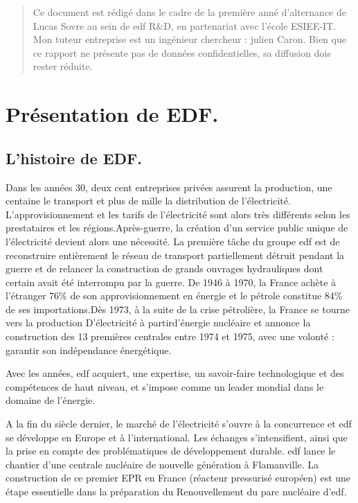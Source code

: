 \begin{abstract}
    Ce document est rédigé dans le cadre de la première anné d'alternance de Lucas Sovre au sein de \acrshort{edf} R\&D, en partenariat avec l'école ESIEE-IT.
    Mon tuteur entreprise est un ingénieur chercheur : julien Caron. Bien que ce rapport ne présente pas de données confidentielles, sa diffusion dois rester réduite.
\end{abstract}
\chapter{Présentation de EDF.}
\section{L'histoire de EDF.}
Dans  les  années  30,  deux  cent  entreprises privées  assurent  la  production,  une  centaine le  transport  et  plus  de  mille  la  distribution  de l’électricité. L’approvisionnement et les tarifs de l’électricité  sont  alors  très  différents  selon les prestataires et les régions.Après-guerre, la création d’un service public unique  de  l’électricité  devient  alors  une nécessité.  La  première  tâche  du  groupe  \acrshort{edf} est  de  reconstruire  entièrement  le  réseau  de transport   partiellement   détruit   pendant   la guerre   et   de   relancer   la   construction   de grands   ouvrages   hydrauliques   dont   certain avait été  interrompu  par  la  guerre. De  1946  à 1970, la France achète à l’étranger 76\% de son approvisionnement  en  énergie  et  le  pétrole constitue 84\% de ses importations.Dès  1973,  à  la  suite  de  la  crise  pétrolière,  la France se tourne vers la production D’électricité à    partird’énergie nucléaire  et  annonce  la  construction  des  13 premières  centrales  entre  1974  et  1975,  avec une   volonté   :   garantir   son   indépendance énergétique.

Avec  les  années,  \acrshort{edf}  acquiert,  une  expertise, un savoir-faire technologique et des compétences  de  haut  niveau,  et  s’impose  comme un leader mondial dans le domaine de l’énergie.

A   la   fin   du   siècle   dernier, le   marché   de l’électricité s’ouvre à la concurrence et \acrshort{edf} se développe en Europe et à l’international. Les échanges s’intensifient, ainsi que la prise en compte des problématiques de développement durable. \acrshort{edf} lance le chantier d’une  centrale  nucléaire  de nouvelle génération  à  Flamanville.  La  construction  de ce premier EPR en France (réacteur pressurisé européen)  est  une  étape  essentielle  dans  la préparation du  Renouvellement du parc nucléaire d’\acrshort{edf}.

